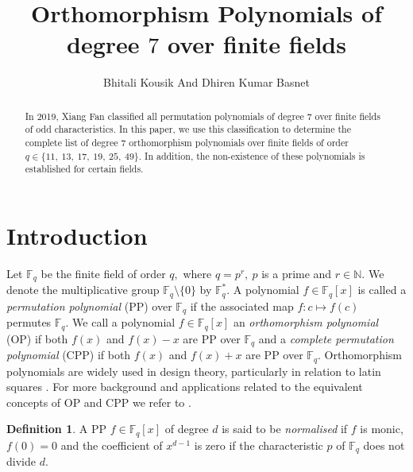\documentclass[12pt,a4wide, reqno]{amsart}
\theoremstyle{definition}
\newtheorem{definition}{Definition}[section]
\theoremstyle{remark}
\numberwithin{equation}{section}
\begin{document}
\title{Orthomorphism Polynomials of degree $7$ over finite fields}
\author{Bhitali Kousik And Dhiren Kumar Basnet }
\address{department of mathematical sciences, tezpur univeristy, tezpur 784028, Assam, India}

\begin{abstract}
    In 2019, Xiang Fan \cite{xfan} classified all permutation polynomials of degree $7$ over finite fields of odd characteristics. In this paper, we use this classification to determine the complete list of degree $7$ orthomorphism polynomials over finite fields of order $q\in\{11,~13,~17,~19,~25,~49\}.$ In addition, the non-existence of these polynomials is established for certain fields.
\end{abstract}
 
\maketitle
\section{Introduction} 
Let $\mathbb{F}_q$ be the finite field of order $q,$ where $q=p^r,~p$ is a prime and $r\in\mathbb{N}$. We denote the multiplicative group $\mathbb{F}_q\setminus\{0\}$ by $\mathbb{F}_q^*.$ A polynomial $f\in \mathbb{F}_q[x]$ is called a \textit{permutation polynomial} (PP) over $\mathbb{F}_q$ if the associated map $f:c \mapsto f(c)$ permutes $\mathbb{F}_q.$ We call a polynomial $f\in \mathbb{F}_q[x]$ an \textit{orthomorphism polynomial} (OP) if both $f(x)$ and $f(x)-x$ are PP over $\mathbb{F}_q$ and a \textit{complete permutation polynomial} (CPP) if both $f(x)$ and $f(x)+x$ are PP over $\mathbb{F}_q.$ Orthomorphism polynomials are widely used in design theory, particularly in relation to latin squares \cite{evans, wanless}. For more background and applications related to the equivalent concepts of OP and CPP we refer to \cite{evans2, winterhof, wanless2, wanless3}. 
\begin{definition}
    A PP $f\in \mathbb{F}_q[x]$ of degree $d$ is said to be \textit{normalised} if $f$ is monic, $f(0)=0$ and the coefficient of $x^{d-1}$ is zero if the characteristic $p$ of $\mathbb{F}_q$ does not divide $d.$ 
\end{definition}
\end{document}
